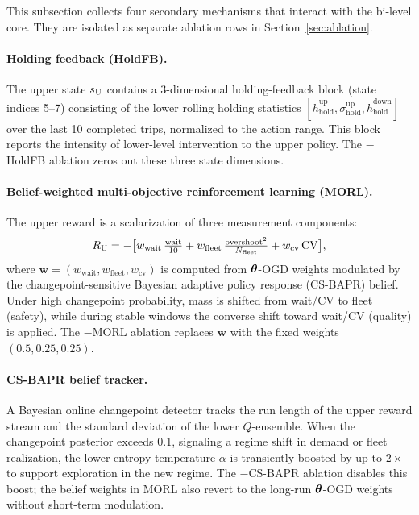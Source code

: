 This subsection collects four secondary mechanisms that interact with the bi-level core. They are isolated as separate ablation rows in Section~\ref{sec:ablation}.

\paragraph{Holding feedback (HoldFB).}
The upper state $s_{\mathrm{U}}$ contains a 3-dimensional holding-feedback block (state indices 5--7) consisting of the lower rolling holding statistics $[\bar{h}_{\text{hold}}^{\text{up}}, \sigma_{\text{hold}}^{\text{up}}, \bar{h}_{\text{hold}}^{\text{down}}]$ over the last 10 completed trips, normalized to the action range. This block reports the intensity of lower-level intervention to the upper policy. The $-$HoldFB ablation zeros out these three state dimensions.

\paragraph{Belief-weighted multi-objective reinforcement learning (MORL).}
The upper reward is a scalarization of three measurement components:
\begin{equation}
\label{eq:morl_reward}
    R_{\mathrm{U}} = -\bigl[w_{\mathrm{wait}}\,\tfrac{\text{wait}}{10} + w_{\mathrm{fleet}}\,\tfrac{\mathrm{overshoot}^2}{N_{\mathrm{fleet}}} + w_{\mathrm{cv}}\,\mathrm{CV}\bigr],
\end{equation}
where $\boldsymbol{w} = (w_{\mathrm{wait}}, w_{\mathrm{fleet}}, w_{\mathrm{cv}})$ is computed from $\boldsymbol{\theta}$-OGD weights modulated by the changepoint-sensitive Bayesian adaptive policy response (CS-BAPR) belief. Under high changepoint probability, mass is shifted from wait/CV to fleet (safety), while during stable windows the converse shift toward wait/CV (quality) is applied. The $-$MORL ablation replaces $\boldsymbol{w}$ with the fixed weights $(0.5, 0.25, 0.25)$.

\paragraph{CS-BAPR belief tracker.}
A Bayesian online changepoint detector tracks the run length of the upper reward stream and the standard deviation of the lower $Q$-ensemble. When the changepoint posterior exceeds 0.1, signaling a regime shift in demand or fleet realization, the lower entropy temperature $\alpha$ is transiently boosted by up to $2\times$ to support exploration in the new regime. The $-$CS-BAPR ablation disables this boost; the belief weights in MORL also revert to the long-run $\boldsymbol{\theta}$-OGD weights without short-term modulation.

